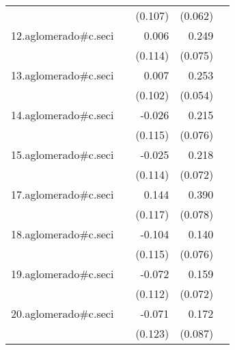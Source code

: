 {\begin{longtable}{l*{4}{D{.}{.}{-1}}}
            &                     &     (0.107)         &     (0.062)         &                     \\
\addlinespace
12.aglomerado#c.seci&                     &       0.006         &       0.249\sym{***}&                     \\
            &                     &     (0.114)         &     (0.075)         &                     \\
\addlinespace
13.aglomerado#c.seci&                     &       0.007         &       0.253\sym{***}&                     \\
            &                     &     (0.102)         &     (0.054)         &                     \\
\addlinespace
14.aglomerado#c.seci&                     &      -0.026         &       0.215\sym{**} &                     \\
            &                     &     (0.115)         &     (0.076)         &                     \\
\addlinespace
15.aglomerado#c.seci&                     &      -0.025         &       0.218\sym{**} &                     \\
            &                     &     (0.114)         &     (0.072)         &                     \\
\addlinespace
17.aglomerado#c.seci&                     &       0.144         &       0.390\sym{***}&                     \\
            &                     &     (0.117)         &     (0.078)         &                     \\
\addlinespace
18.aglomerado#c.seci&                     &      -0.104         &       0.140         &                     \\
            &                     &     (0.115)         &     (0.076)         &                     \\
\addlinespace
19.aglomerado#c.seci&                     &      -0.072         &       0.159\sym{*}  &                     \\
            &                     &     (0.112)         &     (0.072)         &                     \\
\addlinespace
20.aglomerado#c.seci&                     &      -0.071         &       0.172\sym{*}  &                     \\
            &                     &     (0.123)         &     (0.087)         &                     \\

\end{longtable}}
